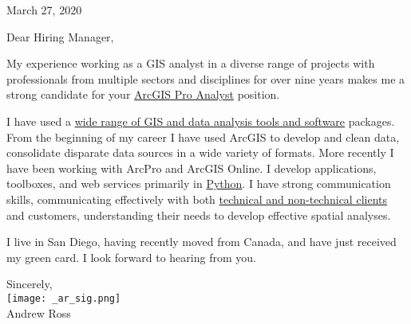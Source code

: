 \documentclass[letterpaper]{article}
\newcommand{\CVjobTitle}{ArcGIS Pro Analyst}
\newcommand{\impt}[1]{\uline{#1}}
\begin{document}
\large

\null\hfill March 27, 2020
\vspace{1em}

Dear Hiring Manager,

My experience working as a GIS analyst in a diverse range of projects with
professionals from multiple sectors and disciplines for over nine years makes me
a strong candidate for your \impt{\CVjobTitle} position.




I have used a \impt{wide range of GIS and data analysis tools and software} packages.
From the beginning of my career I have used ArcGIS to develop and clean data,
consolidate disparate data sources in a wide variety of formats.
More recently I have been working with ArcPro and ArcGIS Online.
I develop applications, toolboxes, and web services primarily in \impt{Python}.
I have strong communication skills, communicating effectively with both
\impt{technical and non-technical clients} and customers, understanding their needs to
develop effective spatial analyses.

I live in San Diego, having recently moved from Canada, and have just received
my green card. I look forward to hearing from you.  


Sincerely,\\
\hspace{1em} \texttt{[image: \_ar\_sig.png]} \\
Andrew Ross
\end{document}
